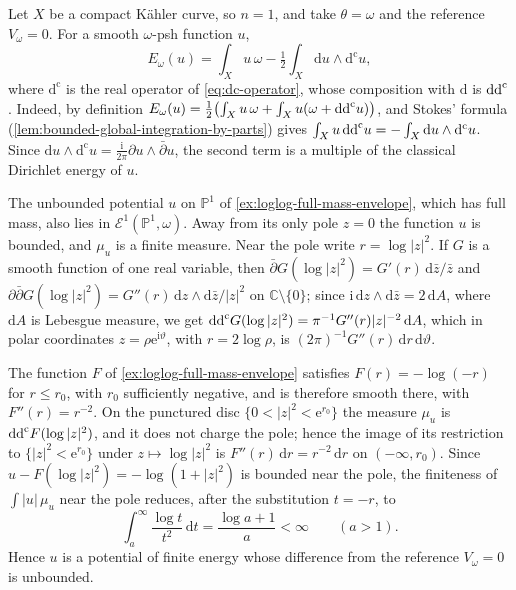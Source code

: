 \begin{example}\label{ex:curve-dirichlet-and-loglog-energy}
Let $X$ be a compact K\"ahler curve, so $n=1$, and take $\theta=\omega$ and the reference $V_\omega=0$. For a smooth $\omega$-psh function $u$,
\[
 E_\omega(u)=\int_Xu\,\omega-\tfrac12
                         \int_X\mathrm du\wedge\mathrm d^{\mathrm c}u,
\]
where $\mathrm d^{\mathrm c}$ is the real operator of \eqref{eq:dc-operator}, whose composition with $\mathrm d$ is $\mathrm{dd}^{\mathrm{c}}$. Indeed, by definition $E_\omega(u)=\frac12\bigl(\int_Xu\,\omega+\int_Xu(\omega+\mathrm{dd}^{\mathrm{c}} u)\bigr)$, and Stokes' formula (\cref{lem:bounded-global-integration-by-parts}) gives $\int_Xu\,\mathrm{dd}^{\mathrm{c}} u=-\int_X\mathrm du\wedge\mathrm d^{\mathrm c}u$. Since $\mathrm du\wedge\mathrm d^{\mathrm c}u=\frac{\mathrm i}{2\pi}\partial u\wedge\bar\partial u$, the second term is a multiple of the classical Dirichlet energy of $u$.

The unbounded potential $u$ on $\mathbb P^1$ of \cref{ex:loglog-full-mass-envelope}, which has full mass, also lies in $\mathcal E^1(\mathbb P^1,\omega)$. Away from its only pole $z=0$ the function $u$ is bounded, and $\mu_u$ is a finite measure. Near the pole write $r=\log|z|^2$. If $G$ is a smooth function of one real variable, then $\bar\partial G(\log|z|^2)=G'(r)\,\mathrm d\bar z/\bar z$ and $\partial\bar\partial G(\log|z|^2)=G''(r)\,\mathrm dz\wedge\mathrm d\bar z/|z|^2$ on $\mathbb C\setminus\{0\}$; since $\mathrm i\,\mathrm dz\wedge\mathrm d\bar z=2\,\mathrm dA$, where $\mathrm dA$ is Lebesgue measure, we get $\mathrm{dd}^{\mathrm{c}} G(\log|z|^2)=\pi^{-1}G''(r)|z|^{-2}\,\mathrm dA$, which in polar coordinates $z=\rho\mathrm e^{\mathrm i\vartheta}$, with $r=2\log\rho$, is $(2\pi)^{-1}G''(r)\,\mathrm dr\,\mathrm d\vartheta$.

The function $F$ of \cref{ex:loglog-full-mass-envelope} satisfies $F(r)=-\log(-r)$ for $r\leq r_0$, with $r_0$ sufficiently negative, and is therefore smooth there, with $F''(r)=r^{-2}$. On the punctured disc $\{0<|z|^2<\mathrm e^{r_0}\}$ the measure $\mu_u$ is $\mathrm{dd}^{\mathrm{c}} F(\log|z|^2)$, and it does not charge the pole; hence the image of its restriction to $\{|z|^2<\mathrm e^{r_0}\}$ under $z\mapsto\log|z|^2$ is $F''(r)\,\mathrm dr=r^{-2}\,\mathrm dr$ on $(-\infty,r_0)$. Since $u-F(\log|z|^2)=-\log(1+|z|^2)$ is bounded near the pole, the finiteness of $\int|u|\,\mu_u$ near the pole reduces, after the substitution $t=-r$, to
\[
 \int_a^\infty\frac{\log t}{t^2}\,\mathrm dt
                         =\frac{\log a+1}{a}<\infty\qquad(a>1).
\]
Hence $u$ is a potential of finite energy whose difference from the reference $V_\omega=0$ is unbounded.
\end{example}

